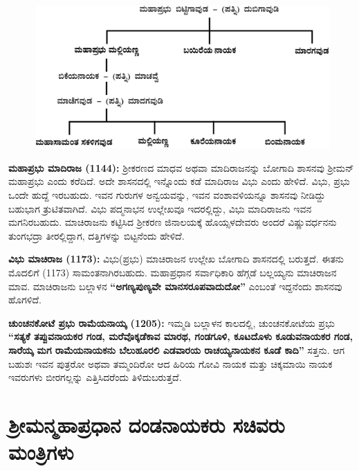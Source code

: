 \begin{figure}[H]
\includegraphics[scale=.15]{images/chap3/chap3fig10.jpeg}
\end{figure}

\textbf{ಮಹಾಪ್ರಭು ಮಾದಿರಾಜ (1144):} ಶ‍್ರೀಕರಣದ ಮಾಧವ ಅಥವಾ ಮಾದಿರಾಜನನ್ನು ಬೋಗಾದಿ ಶಾಸನವು ಶ‍್ರೀಮನ್\-​ಮಹಾಪ್ರಭು ಎಂದು ಕರೆದಿದೆ. ಅದೇ ಶಾಸನದಲ್ಲಿ ಇನ್ನೊಂದು ಕಡೆ ಮಾದಿರಾಜ ವಿಭು ಎಂದು ಹೇಳಿದೆ. ವಿಭು, ಪ್ರಭು ಒಂದೇ ಹುದ್ದೆ ಇರಬಹುದು. ಇವನ ಗುರುಗಳ ಅನ್ವಯವನ್ನು, ಇವನ ವಂಶಾವಳಿಯನ್ನೂ ಶಾಸನವು ನೀಡಿದ್ದು ಬಹುಭಾಗ ತ್ರುಟಿತವಾಗಿದೆ. ವಿಭು ಪದ್ಮನಾಭನ ಉಲ್ಲೇಖವೂ ಇದರಲ್ಲಿದ್ದು, ವಿಭು ಮಾದಿರಾಜನು ಇವನ ಮಗನಿರಬಹುದು. ಮಾಚಿರಾಜನು ಕಟ್ಟಿಸಿದ ಶ‍್ರೀಕರಣ ಜಿನಾಲಯಕ್ಕೆ ಹೊಯ್ಸಳದೇವರು ಅಂದರೆ ವಿಷ್ಣುವರ್ಧನನು ತುಂಗಭದ್ರಾ ತೀರಲ್ಲಿದ್ದಾಗ, ದತ್ತಿಗಳನ್ನು ಬಿಟ್ಟನೆಂದು ಹೇಳಿದೆ.

\textbf{ವಿಭು ಮಾಚಿರಾಜ (1173):} ವಿಭು(ಪ್ರಭು) ಮಾಚಿರಾಜನ ಉಲ್ಲೇಖ ಬೋಗಾದಿ ಶಾಸನದಲ್ಲಿ ಬರುತ್ತದೆ. ಈತನು ಮೊದಲಿಗೆ (1173) ಸಾಮಂತನಾಗಿರಬಹುದು. ಮಹಾಪ್ರಧಾನ ಸರ್ವಾಧಿಕಾರಿ ಹೆಗ್ಗಡೆ ಬಲ್ಲಯ್ಯನು ಮಾಚಿರಾಜನ ಮಾವ. ಮಾಚಿರಾಜನು ಬಲ್ಲಾಳನ \textbf{“ಅಗಣ್ಯಪುಣ್ಯವೇ ಮಾನಸರೂಪವಾದುದೋ”} ಎಂಬಂತೆ ಇದ್ದನೆಂದು ಶಾಸನವು ಹೊಗಳಿದೆ.

\textbf{ಚುಂಚನಕೋಟೆ ಪ್ರಭು ರಾಮೆಯನಾಯ್ಕ (1205):} ಇಮ್ಮಡಿ ಬಲ್ಲಾಳನ ಕಾಲದಲ್ಲಿ, ಚುಂಚನಕೋಟೆಯ ಪ್ರಭು \textbf{“ಸತ್ಯಕೆ ತಪ್ಪುವನಾಯಕರ ಗಂಡ, ಮರೆವೊಕ್ಕಡೆಕಾವ ಮಾರಥ, ಗಂಡಗೂಳಿ, ಕೂಟದೊಳು ಕೂಡುವನಾಯಕರ ಗಂಡ, ಸಾರೆಯ್ಕ ಮಗ ರಾಮೆಯನಾಯಕನು ಬೆಲುಹೂರಲಿ ಎಡವಾರಯ ರಾಚಯ್ಯನಾಯಕನ ಕೂಡೆ ಕಾದಿ”} ಸತ್ತನು. ಆಗ ಬಹುಶಃ ಇವನ ಪುತ್ರರೋ ಅಥವಾ ತಮ್ಮಂದಿರೋ ಆದ ಹಿರಿಯ ಗೋವಿ ನಾಯಕ ಮತ್ತು ಚಿಕ್ಕಮಾಯಿ ನಾಯಕ ಇವರುಗಳು ಬೀರಗಲ್ಲನ್ನು ಎತ್ತಿಸಿದರೆಂದು ತಿಳಿದುಬರುತ್ತದೆ.

\section*{ಶ‍್ರೀಮನ್ಮಹಾಪ್ರಧಾನ ದಂಡನಾಯಕರು\enginline{-} ಸಚಿವರು\enginline{-} ಮಂತ್ರಿಗಳು}

